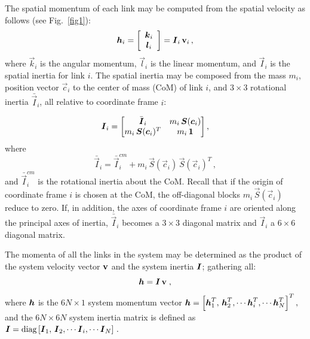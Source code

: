 \documentclass{llncs}
\newcommand{\bI}{\mbox{\boldmath $I$}}
\newcommand{\bh}{\mbox{\boldmath $h$}}
\newcommand{\vc}{\vec{c}}
\newcommand{\vI}{\vec{I}}
\newcommand{\vIb}{\bar{\vI}}
\newcommand{\vk}{\vec{k}}
\newcommand{\BM}{\begin{bmatrix}}
\newcommand{\EM}{\end{bmatrix}}
\newcommand{\bone}{{\bf 1}}
\newcommand{\diag}{{\rm diag}}
\newcommand{\vIbar}{\bar{\vI}}
\newcommand{\vl}{\vec{l}}
\newcommand{\vS}{\vec{S}}
\newcommand{\bv}{{\bf v}}
\begin{document}
The spatial momentum of each link may be computed from the spatial velocity as follows
(see Fig.~\ref{fig1}):
%
\begin{equation}
\bh_i = \left[ \begin{array}{c} \vk_i \\ \vl_i \end{array} \right] = \vI_i \, \bv_i \, ,
\end{equation}
%
where $\vk_i$ is the angular momentum, $\vl_i$ is the linear
momentum, and $\vI_i$ is the spatial inertia for link $i$. The
spatial inertia may be composed from the mass $m_i$, position vector $\vc_i$
to the center of mass (CoM)  of link $i$, and $3 \times 3$ rotational
inertia $\vIb_i$, all relative to coordinate frame $i$:

\begin{equation}
\label{eq:spatialinertia}
\vI_i =
\BM
  \vIbar_i & m_i \, \vS(\vc_i) \\ m_i \, \vS(\vc_i)^T & m_i \, \bone
\EM ,
\end{equation}
%
where
%
\begin{equation}
\vIbar_i = \vIbar^{cm}_i \!\! + m_i \, \vS(\vc_i) \, \vS(\vc_i)^T \, ,
\end{equation}
%
and $\vIbar^{cm}_i$ is the rotational inertia about the CoM.
Recall that if the origin of coordinate frame $i$ is chosen
at the CoM, the off-diagonal blocks $m_i \, \vS(\vc_i)$
reduce to zero. If, in addition, the axes of coordinate frame $i$
are oriented along the principal axes of inertia, $\vIbar_i$ becomes a
$3\times 3$ diagonal matrix and $\vI_i$ a $6\times 6$ diagonal matrix.


The momenta of all the links in the system may be determined as the
product of the system velocity vector $\bv$ and the system inertia
$\bI$; gathering all:
%
\begin{equation}
\label{eq:h}
\bh = \bI \, \bv \; ,
\end{equation}
%
where $\bh$ is the $6N\times 1$ system momentum vector $\bh = \left[ \bh_1^T, \, \bh_2^T, \cdots \bh_i^T, \cdots \bh_N^T \right]^T,$
and the $6N \times 6N$ system inertia matrix is defined as
$\bI = \diag \left[ \vI_1, \, \vI_2, \cdots \vI_i, \cdots \vI_N \right] \, .$
%

\end{document}
